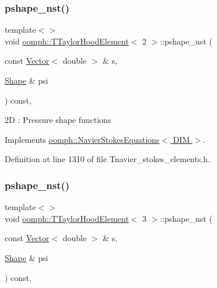 \mbox{\label{classoomph_1_1TTaylorHoodElement_a38f381e73312dd3659a3f5fa1c18e2dd}} 
\subsubsection{\texorpdfstring{pshape\+\_\+nst()}{pshape\_nst()}\hspace{0.1cm}{\footnotesize\ttfamily [3/4]}}
{\footnotesize\ttfamily template$<$$>$ \\
void \hyperlink{classoomph_1_1TTaylorHoodElement}{oomph\+::\+T\+Taylor\+Hood\+Element}$<$ 2 $>$\+::pshape\+\_\+nst (\begin{DoxyParamCaption}\item[{const \hyperlink{classoomph_1_1Vector}{Vector}$<$ double $>$ \&}]{s,  }\item[{\hyperlink{classoomph_1_1Shape}{Shape} \&}]{psi }\end{DoxyParamCaption}) const\hspace{0.3cm}{\ttfamily [inline]}, {\ttfamily [virtual]}}

2D \+: Pressure shape functions 

Implements \hyperlink{classoomph_1_1NavierStokesEquations_a487030303b71da299aed3d4639a022ab}{oomph\+::\+Navier\+Stokes\+Equations$<$ D\+I\+M $>$}.



Definition at line 1310 of file Tnavier\+\_\+stokes\+\_\+elements.\+h.

\mbox{\label{classoomph_1_1TTaylorHoodElement_ac060f5a09eb0fe6e0d3db255fa8cbceb}} 
\subsubsection{\texorpdfstring{pshape\+\_\+nst()}{pshape\_nst()}\hspace{0.1cm}{\footnotesize\ttfamily [4/4]}}
{\footnotesize\ttfamily template$<$$>$ \\
void \hyperlink{classoomph_1_1TTaylorHoodElement}{oomph\+::\+T\+Taylor\+Hood\+Element}$<$ 3 $>$\+::pshape\+\_\+nst (\begin{DoxyParamCaption}\item[{const \hyperlink{classoomph_1_1Vector}{Vector}$<$ double $>$ \&}]{s,  }\item[{\hyperlink{classoomph_1_1Shape}{Shape} \&}]{psi }\end{DoxyParamCaption}) const\hspace{0.3cm}{\ttfamily [inline]}, {\ttfamily [virtual]}}

